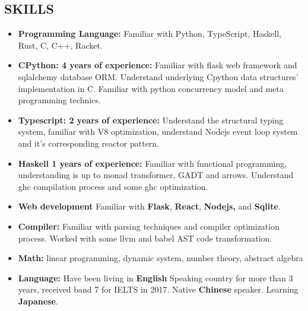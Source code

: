 \documentclass{res}
\begin{document}
\begin{resume}
\section{SKILLS}
    \begin{itemize}[leftmargin=-.2in]
        \setlength\itemsep{-1em}
        \item \textbf{Programming Language:} Familiar with Python, TypeScript, Haskell, Rust, C, C++, Racket.\\
        \item \textbf{CPython: 4 years of experience:} Familiar with flask web framework and sqlalchemy database ORM. Understand underlying Cpython data structures' implementation in C. Familiar with python concurrency model and meta programming technics. \\
        \item \textbf{Typescript: 2 years of experience:} Understand the structural typing system, familiar with V8 optimization, understand Nodejs event loop system and it's corresponding reactor pattern. \\
        \item \textbf{Haskell 1 years of experience:} Familiar with functional programming, understanding is up to monad transformer, GADT and arrows. Understand ghc compilation process and some ghc optimization. \\
        \item \textbf{Web development} Familiar with \textbf{Flask}, \textbf{React},\textbf{ Nodejs,} and \textbf{Sqlite}. \\
        \item \textbf{Compiler:} Familiar with parsing techniques and compiler optimization process. Worked with some llvm and babel AST code transformation. \\
        \item \textbf{Math:} linear programming, dynamic system, number theory, abstract algebra \\
        \item \textbf{Language:} Have been living in \textbf{English} Speaking country for more than 3 years, received band 7 for IELTS in 2017. Native \textbf{Chinese} speaker. Learning \textbf{Japanese}.
    \end{itemize}

\end{resume}
\end{document}
